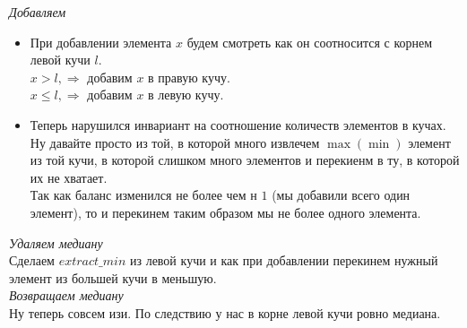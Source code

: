 \documentclass[14pt,a4paper,report]{ncc}
\begin{document}
\textit{Добавляем}
\begin{itemize}
    \item {
        При добавлении элемента $x$ будем смотреть как он соотносится с корнем левой кучи $l$.\\
        $x > l, \Rightarrow$ добавим $x$ в правую кучу.\\
        $x \leq l, \Rightarrow$ добавим $x$ в левую кучу.\\

    }
    \item {
        Теперь нарушился инвариант на соотношение количеств элементов в кучах.
        Ну давайте просто из той, в которой много извлечем $\operatorname{max}(\operatorname{min})$ элемент из той кучи, в которой слишком много элементов и перекиенм в ту, в которой их не хватает.\\
        Так как баланс изменился не более чем н $1$ (мы добавили всего один элемент), то и перекинем таким образом мы не более одного элемента.
    }
\end{itemize}

\textit{Удаляем медиану}\\
Сделаем $extract\_min$ из левой кучи и как при добавлении перекинем нужный элемент из большей кучи в меньшую.\\

\textit{Возвращаем медиану}\\
Ну теперь совсем изи. По следствию у нас в корне левой кучи ровно медиана.\\
\end{document}
